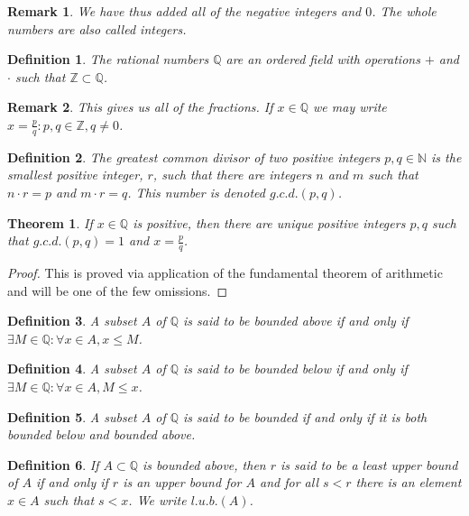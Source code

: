 \documentclass[12pt,oneside]{book}
\theoremstyle{mystyle}
\newtheorem{theorem}{Theorem}[section]
\newtheorem{definition}{Definition}[section]
\newtheorem{remark}{Remark}[section]
\begin{document}
\begin{remark}
We have thus added all of the negative integers and $0$. The whole numbers are also called integers.
\end{remark}

\begin{definition}
The rational numbers $\mathbb{Q}$ are an ordered field with operations $+$ and $\cdot$ such that $\mathbb{Z}\subset \mathbb{Q}$.
\end{definition}

\begin{remark}
This gives us all of the fractions. If $x\in \mathbb{Q}$ we may write $x= \frac{p}{q}:p,q\in \mathbb{Z}, q\ne 0$.
\end{remark}

\begin{definition}
The greatest common divisor of two positive integers $p,q\in \mathbb{N}$ is the smallest positive integer, $r$, such that there are integers $n$ and $m$ such that $n\cdot r = p$ and $m\cdot r = q$. This number is denoted $g.c.d.(p,q)$.
\end{definition}

\begin{theorem}
If $x\in \mathbb{Q}$ is positive, then there are unique positive integers $p, q$ such that $g.c.d.(p,q)=1$ and $x=\frac{p}{q}$.
\end{theorem}
\begin{proof}
This is proved via application of the fundamental theorem of arithmetic and will be one of the few omissions.
\end{proof}

\begin{definition}
A subset $A$ of $\mathbb{Q}$ is said to be bounded above if and only if $\exists M\in \mathbb{Q}: \forall x\in A,x \leq M$.
\end{definition}

\begin{definition}
A subset $A$ of $\mathbb{Q}$ is said to be bounded below if and only if $\exists M\in \mathbb{Q}:\forall x\in A,M\leq x$. 
\end{definition}

\begin{definition}
A subset $A$ of $\mathbb{Q}$ is said to be bounded if and only if it is both bounded below and bounded above.
\end{definition}

\begin{definition}
If $A\subset \mathbb{Q}$ is bounded above, then $r$ is said to be a least upper bound of $A$ if and only if $r$ is an upper bound for $A$ and for all $s<r$ there is an element $x\in A$ such that $s<x$. We write $l.u.b.(A)$.
\end{definition}
\end{document}
